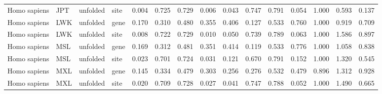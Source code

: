 \begin{longtable}{llllrrrrrrrrrrr}
        Homo sapiens &                       JPT &  unfolded &  site &                              0.004 &                               0.725 &                 0.729 &                 0.006 &                              0.043 &                               0.747 &                 0.791 &                 0.054 &        1.000 &  0.593 &  0.137 \\
        Homo sapiens &                       LWK &  unfolded &  gene &                              0.170 &                               0.310 &                 0.480 &                 0.355 &                              0.406 &                               0.127 &                 0.533 &                 0.760 &        1.000 &  0.919 &  0.709 \\
        Homo sapiens &                       LWK &  unfolded &  site &                              0.008 &                               0.722 &                 0.729 &                 0.010 &                              0.050 &                               0.739 &                 0.789 &                 0.063 &        1.000 &  1.586 &  0.897 \\
        Homo sapiens &                       MSL &  unfolded &  gene &                              0.169 &                               0.312 &                 0.481 &                 0.351 &                              0.414 &                               0.119 &                 0.533 &                 0.776 &        1.000 &  1.058 &  0.838 \\
        Homo sapiens &                       MSL &  unfolded &  site &                              0.023 &                               0.701 &                 0.724 &                 0.031 &                              0.121 &                               0.670 &                 0.791 &                 0.152 &        1.000 &  1.320 &  0.545 \\
        Homo sapiens &                       MXL &  unfolded &  gene &                              0.145 &                               0.334 &                 0.479 &                 0.303 &                              0.256 &                               0.276 &                 0.532 &                 0.479 &        0.896 &  1.312 &  0.928 \\
        Homo sapiens &                       MXL &  unfolded &  site &                              0.020 &                               0.709 &                 0.728 &                 0.027 &                              0.041 &                               0.747 &                 0.788 &                 0.052 &        1.000 &  1.490 &  0.665 \\

\end{longtable}
